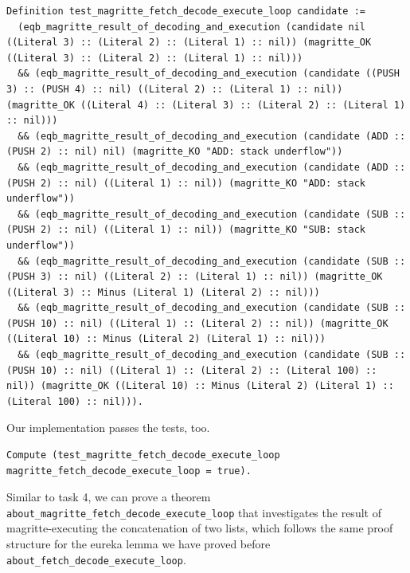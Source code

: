\documentclass{article}
\begin{document}
\begin{lstlisting}
Definition test_magritte_fetch_decode_execute_loop candidate :=
  (eqb_magritte_result_of_decoding_and_execution (candidate nil ((Literal 3) :: (Literal 2) :: (Literal 1) :: nil)) (magritte_OK ((Literal 3) :: (Literal 2) :: (Literal 1) :: nil)))
  && (eqb_magritte_result_of_decoding_and_execution (candidate ((PUSH 3) :: (PUSH 4) :: nil) ((Literal 2) :: (Literal 1) :: nil)) (magritte_OK ((Literal 4) :: (Literal 3) :: (Literal 2) :: (Literal 1) :: nil)))
  && (eqb_magritte_result_of_decoding_and_execution (candidate (ADD :: (PUSH 2) :: nil) nil) (magritte_KO "ADD: stack underflow"))
  && (eqb_magritte_result_of_decoding_and_execution (candidate (ADD :: (PUSH 2) :: nil) ((Literal 1) :: nil)) (magritte_KO "ADD: stack underflow"))
  && (eqb_magritte_result_of_decoding_and_execution (candidate (SUB :: (PUSH 2) :: nil) ((Literal 1) :: nil)) (magritte_KO "SUB: stack underflow"))
  && (eqb_magritte_result_of_decoding_and_execution (candidate (SUB :: (PUSH 3) :: nil) ((Literal 2) :: (Literal 1) :: nil)) (magritte_OK ((Literal 3) :: Minus (Literal 1) (Literal 2) :: nil)))
  && (eqb_magritte_result_of_decoding_and_execution (candidate (SUB :: (PUSH 10) :: nil) ((Literal 1) :: (Literal 2) :: nil)) (magritte_OK ((Literal 10) :: Minus (Literal 2) (Literal 1) :: nil)))
  && (eqb_magritte_result_of_decoding_and_execution (candidate (SUB :: (PUSH 10) :: nil) ((Literal 1) :: (Literal 2) :: (Literal 100) :: nil)) (magritte_OK ((Literal 10) :: Minus (Literal 2) (Literal 1) :: (Literal 100) :: nil))).
\end{lstlisting}

Our implementation passes the tests, too.

\begin{lstlisting}
Compute (test_magritte_fetch_decode_execute_loop magritte_fetch_decode_execute_loop = true).
\end{lstlisting}

Similar to task 4, we can prove a theorem \texttt{about\_magritte\_fetch\_decode\_execute\_loop} that investigates the result of magritte-executing the concatenation of two lists, which follows the same proof structure for the eureka lemma we have proved before \texttt{about\_fetch\_decode\_execute\_loop}.
\end{document}
